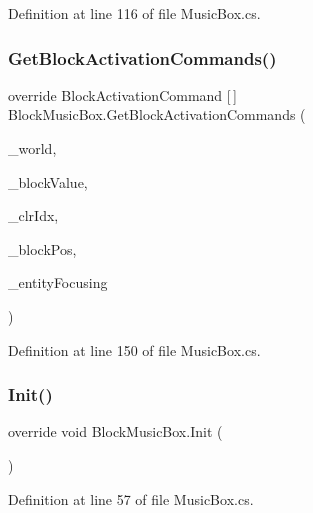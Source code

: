 Definition at line 116 of file Music\+Box.\+cs.

\mbox{\label{class_block_music_box_a59de4b1cf03b0f6f1f601ab02aa8e064}} 
\subsubsection{\texorpdfstring{GetBlockActivationCommands()}{GetBlockActivationCommands()}}
{\footnotesize\ttfamily override Block\+Activation\+Command \mbox{[}$\,$\mbox{]} Block\+Music\+Box.\+Get\+Block\+Activation\+Commands (\begin{DoxyParamCaption}\item[{World\+Base}]{\+\_\+world,  }\item[{Block\+Value}]{\+\_\+block\+Value,  }\item[{int}]{\+\_\+clr\+Idx,  }\item[{Vector3i}]{\+\_\+block\+Pos,  }\item[{Entity\+Alive}]{\+\_\+entity\+Focusing }\end{DoxyParamCaption})}



Definition at line 150 of file Music\+Box.\+cs.

\mbox{\label{class_block_music_box_a918cf2f3e7bf4e142d8eed610d611604}} 
\subsubsection{\texorpdfstring{Init()}{Init()}}
{\footnotesize\ttfamily override void Block\+Music\+Box.\+Init (\begin{DoxyParamCaption}{ }\end{DoxyParamCaption})}



Definition at line 57 of file Music\+Box.\+cs.

\mbox{\label{class_block_music_box_aa9c10407f1ca52c9e4b7d83645581d21}} 

